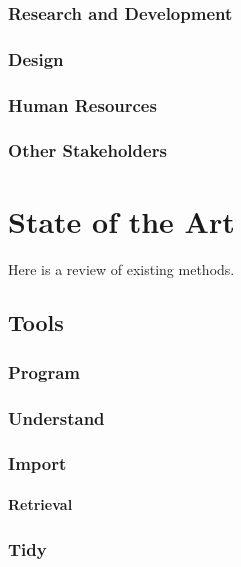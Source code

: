 \documentclass[]{book}
\begin{document}
\subsection{Research and Development}\label{research-and-development}

\subsection{Design}\label{design}

\subsection{Human Resources}\label{human-resources}

\subsection{Other Stakeholders}\label{other-stakeholders}

\chapter{State of the Art}\label{state-of-the-art}

Here is a review of existing methods.

\section{Tools}\label{tools}

\subsection{Program}\label{program}

\subsection{Understand}\label{understand}

\subsection{Import}\label{import}

\subsubsection{Retrieval}\label{retrieval}

\subsection{Tidy}\label{tidy}
\end{document}
